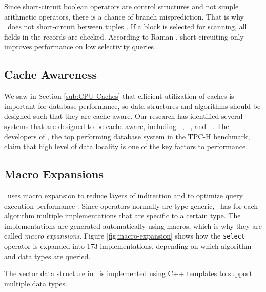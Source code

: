 Since short-circuit boolean operators are control structures and not simple arithmetic operators, there is a chance of branch misprediction. That is why \blink~does not short-circuit between tuples \cite{Raman2008-gi, Johnson2008-cp}. If a block is selected for scanning, all fields in the records are checked. According to Raman \ea, short-circuiting only improves performance on low selectivity queries \cite{Raman2008-gi}.

\subsection{Cache Awareness}
\label{sub:Cache Awareness}
We saw in Section \ref{sub:CPU Caches} that efficient utilization of caches is important for database performance, so data structures and algorithms should be designed such that they are cache-aware. Our research has identified several systems that are designed to be cache-aware, including \monetdb~\cite{Boncz2002-yj}, \mssql~\cite{Lahiri2015-mz}, and \ibm~\cite{Raman2013-em}. The developers of \exasol, the top performing database system in the TPC-H benchmark, claim that high level of data locality is one of the key factors to performance.

\subsection{Macro Expansions}
\label{sub:Macro Expansions}

\monetdb~uses macro expansion to reduce layers of indirection and to optimize query execution performance \cite{Boncz2002-yj}. Since operators normally are type-generic, \monetdb~has for each algorithm multiple implementations that are specific to a certain type. The implementations are generated automatically using macros, which is why they are called \textit{macro expansions}. Figure \ref{fig:macro-expansion} shows how the \texttt{select} operator is expanded into 173 implementations, depending on which algorithm and data types are queried.

The vector data structure in \ibm~is implemented using C++ templates to support multiple data types.

